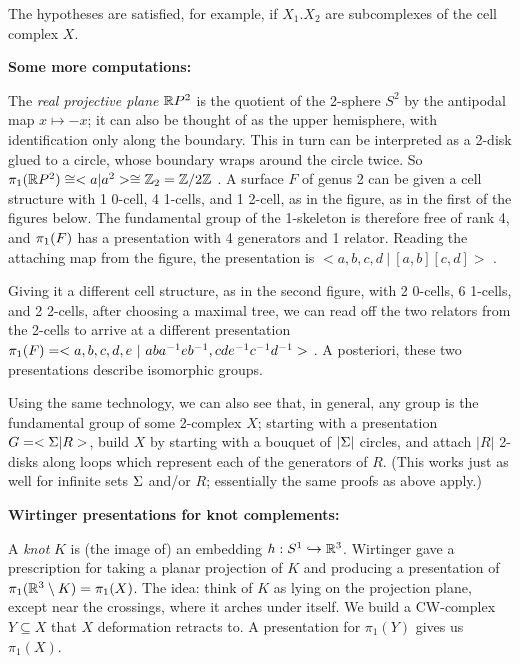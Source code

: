 \msk

The hypotheses are satisfied, for example, if $X_1.X_2$ are subcomplexes of the
cell complex $X$.

\msk

{\bf Some more computations:}

\msk

The {\it real projective plane} ${\Bbb R}P^2$ is the quotient of 
the 2-sphere $S^2$ by the antipodal map $x\mapsto -x$; 
it can also be thought of as the upper hemisphere, with 
identification only along the boundary. This in turn can be 
interpreted as a 2-disk glued to a circle, whose boundary
wraps around the circle twice. So $\pi_1({\Bbb R}P^2)\cong 
<a | a^2>\cong {\Bbb Z}_2 = {\Bbb Z}/2{\Bbb Z}$ .
A surface $F$ of genus 2 can be given a cell structure with 1 0-cell,
4 1-cells, and 1 2-cell, as in the figure, as in the first of the 
figures below. The fundamental group
of the 1-skeleton is therefore free of rank 4, and $\pi_1(F)$ has
a presentation with 4 generators and 1 relator. Reading the attaching
map from the figure, the presentation is $<a,b,c,d\ |\ [a,b][c,d] >$ .

\msk



\leavevmode

\epsfxsize=5.6in

\msk

Giving it a different cell structure, as in the second figure, with 2 0-cells,
6 1-cells, and 2 2-cells, after choosing a maximal tree, we can read off the
two relators from the 2-cells to arrive at a different presentation
$\pu(F) = <a,b,c,d,e\ |\ aba^{-1}eb^{-1},cde^{-1}c^{-1}d^{-1}>$ . A posteriori,
these two presentations describe isomorphic groups.

\bsk

Using the same technology, we can also see that, in general, 
any group is the fundamental group of some 2-complex $X$;
starting with a presentation $G = <\Sigma | R>$, build $X$ by starting
with a bouquet of $|\Sigma|$ circles, and attach $|R|$ 2-disks along
loops which represent each of the generators of $R$. (This works just
as well for infinite sets $\Sigma$ and/or $R$; essentially the same proofs
as above apply.)

\bsk

{\bf Wirtinger presentations for knot complements:}

\msk

A {\it knot} $K$ is (the image of) an embedding $h:S^1\hookrightarrow{\Bbb R}^3$. Wirtinger 
gave a prescription for taking a planar projection of $K$ and producing a presentation
of $\pi_1({\Bbb R}^3\setminus K)=\pi_1(X)$. The idea: think of $K$ as lying on the projection
plane, except near the crossings, where it arches under itself. 
We build a CW-complex $Y\subseteq X$ that $X$ deformation retracts to. A presentation for $\pi_1(Y)$
gives us $\pi_1(X)$.

